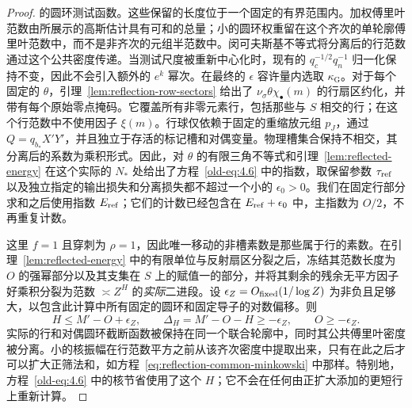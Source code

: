 \documentclass[11pt,a4paper]{article}
\numberwithin{equation}{section}
\numberwithin{figure}{section}
\theoremstyle{definition}
\theoremstyle{remark}
\begin{document}
\begin{proof}
的圆环测试函数。这些保留的长度位于一个固定的有界范围内。加权傅里叶范数由所展示的高斯估计具有可和的总量；小的圆环权重留在这个齐次的单轮廓傅里叶范数中，而不是非齐次的元组半范数中。闵可夫斯基不等式将分离后的行范数通过这个公共密度传递。当测试尺度被重新中心化时，现有的 $q_c^{-1/2}q_n^{-1}$ 归一化保持不变，因此不会引入额外的 $e^k$ 幂次。在最终的 $\epsilon$ 容许量内选取 $\kappa_{\mathrm G}$。对于每个固定的 $\theta$，引理~\ref{lem:reflection-row-sectors} 给出了 $\nu_\sigma\theta\chi_\bullet(m)$ 的行扇区约化，并带有每个原始零点掩码。它覆盖所有非零元素行，包括那些与 $S$ 相交的行；在这个行范数中不使用因子 $\xi(m)$。行球仅依赖于固定的重缩放元组 $p_J$，通过 $Q=q_{b_*}X'Y'$，并且独立于存活的标记槽和对偶变量。物理槽集合保持不相交，其分离后的系数为乘积形式。因此，对 $\theta$ 的有限三角不等式和引理~\ref{lem:reflected-energy} 在这个实际的 $N_*$ 处给出了方程~\eqref{old-eq:4.6} 中的指数，取保留参数 $\tau_{\rm ref}$ 以及独立指定的输出损失和分离损失都不超过一个小的 $\epsilon_0>0$。我们在固定行部分求和之后使用指数 $E_{\rm ref}$；它们的计数已经包含在 $E_{\rm ref}+\epsilon_0$ 中，主指数为 $O/2$，不再重复计数。

这里 $f=1$ 且穿刺为 $\rho=1$，因此唯一移动的非槽素数是那些属于行的素数。在引理~\ref{lem:reflected-energy} 中的有限单位与反射扇区分裂之后，冻结其范数长度为 $O$ 的强幂部分以及其支集在 $S$ 上的赋值一的部分，并将其剩余的残余无平方因子好乘积分裂为范数 $\asymp Z^H$ 的\emph{实际}二进段。设 $\epsilon_Z=O_{\rm fixed}(1/\log Z)$ 为非负且足够大，以包含此计算中所有固定的圆环和固定导子的对数偏移。则
\[
 H\le M'-O+\epsilon_Z,\qquad
 \Delta_H=M'-O-H\ge-\epsilon_Z,\qquad O\ge-\epsilon_Z.
\]
实际的行和对偶圆环截断函数被保持在同一个联合轮廓中，同时其公共傅里叶密度被分离。小的核振幅在行范数平方之前从该齐次密度中提取出来，只有在此之后才可以扩大正筛法和，如方程~\eqref{eq:reflection-common-minkowski} 中那样。特别地，方程~\eqref{old-eq:4.6} 中的核节省使用了这个 $H$；它不会在任何由正扩大添加的更短行上重新计算。


\end{proof}
\end{document}
